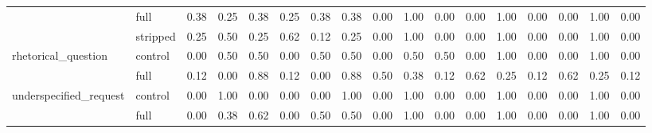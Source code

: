 \begin{tabular}{llrrrrrrrrrrrrrrr}
 & full & 0.38 & 0.25 & 0.38 & 0.25 & 0.38 & 0.38 & 0.00 & 1.00 & 0.00 & 0.00 & 1.00 & 0.00 & 0.00 & 1.00 & 0.00 \\
 & stripped & 0.25 & 0.50 & 0.25 & 0.62 & 0.12 & 0.25 & 0.00 & 1.00 & 0.00 & 0.00 & 1.00 & 0.00 & 0.00 & 1.00 & 0.00 \\
\cline{1-17}
\multirow[t]{2}{*}{rhetorical_question} & control & 0.00 & 0.50 & 0.50 & 0.00 & 0.50 & 0.50 & 0.00 & 0.50 & 0.50 & 0.00 & 1.00 & 0.00 & 0.00 & 1.00 & 0.00 \\
 & full & 0.12 & 0.00 & 0.88 & 0.12 & 0.00 & 0.88 & 0.50 & 0.38 & 0.12 & 0.62 & 0.25 & 0.12 & 0.62 & 0.25 & 0.12 \\
\cline{1-17}
\multirow[t]{2}{*}{underspecified_request} & control & 0.00 & 1.00 & 0.00 & 0.00 & 0.00 & 1.00 & 0.00 & 1.00 & 0.00 & 0.00 & 1.00 & 0.00 & 0.00 & 1.00 & 0.00 \\
 & full & 0.00 & 0.38 & 0.62 & 0.00 & 0.50 & 0.50 & 0.00 & 1.00 & 0.00 & 0.00 & 1.00 & 0.00 & 0.00 & 1.00 & 0.00 \\
\cline{1-17}
\bottomrule
\end{tabular}
